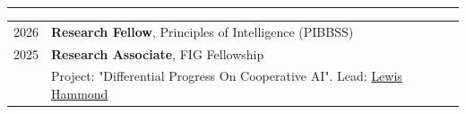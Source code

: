 \hrule 
\begin{longtable}[l]{@{}p{} p{}}

    2026 & \textbf{Research Fellow}, Principles of Intelligence (PIBBSS)
    \vspace{2mm} \\

    2025 & \textbf{Research Associate}, FIG Fellowship \\
    & Project: "Differential Progress On Cooperative AI". Lead: \href{https://lewishammond.com/}{Lewis Hammond}
\end{longtable}
